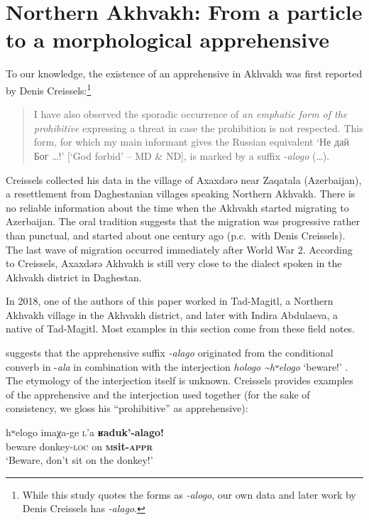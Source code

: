 \documentclass[output=paper,colorlinks,citecolor=brown]{langscibook}
\begin{document}
\section{Northern Akhvakh: From a particle to a morphological apprehensive}
\label{sec:NAkhvakh}
 
To our knowledge, the existence of an apprehensive in Akhvakh was first reported by Denis Creissels:\footnote{While this study quotes the forms as \textit{-alogo}, our own data and later work by Denis Creissels \citeyear{Creisselsunpublished2} has \textit{-alago}.} 

\begin{quote}
    I have also observed the sporadic occurrence of \textit{an emphatic form of the prohibitive} expressing a threat in case the prohibition is not respected. This form, for which my main informant gives the Russian equivalent `Не дай Бог …!' [`God forbid' -- MD \& ND], is marked by a suffix \textit{-alogo} (\ldots). \citep{Creisselsunpublished1}
\end{quote}

Creissels collected his data in the village of Axaxdərə near Zaqatala (Azerbaijan), a resettlement from Daghestanian villages speaking Northern Akhvakh. There is no reliable information about the time when the Akhvakh started migrating to Azerbaijan. The oral tradition suggests that the migration was progressive rather than punctual, and started about one century ago (p.c.\  with Denis Creissels). The last wave of migration occurred immediately after World War 2. According to Creissels, Axaxdərə Akhvakh is still very close to the dialect spoken in the Akhvakh district in Daghestan. 

In 2018, one of the authors of this paper worked in Tad-Magitl, a Northern Akhvakh village in the Akhvakh district, and later with Indira Abdulaeva, a native of Tad-Magitl. Most examples in this section come from these field notes.

\citet{Creisselsunpublished2} suggests that the apprehensive suffix \textit{-alago} originated from the conditional converb in \nobreakdash-\textit{ala} in combination with the interjection \textit{hologo \textasciitilde hʷelogo} `beware!' . The etymology of the interjection itself is unknown. Creissels provides examples of the apprehensive and the interjection used together (for the sake of consistency, we gloss his ``prohibitive'' as apprehensive):

\ea \label{ex:DD60}
\gll hʷelogo imaχa-ge \textsc{l}'a \textbf{ʁad{\textlangle}u{\textrangle}k'-alago!} \\
beware donkey-\textsc{loc} on \textbf{\textsc{{\textlangle}m{\textrangle}}sit-\textsc{appr}} \\
\glt `Beware, don't sit on the donkey!' 
\citep{Creisselsunpublished1}
\z
\end{document}
